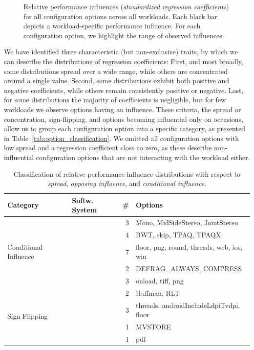 {\begin{figure}
	\caption{Relative performance influences (\textit{standardized regression coefficients}) for all configuration options across all workloads. Each black bar depicts a workload-specific performance influence. For each configuration option, we highlight the range of observed influences.}
	\label{fig:results_influence}
\end{figure}
{\color{orange!80!black}
	We have identified three characteristic (but non-exclusive) traits, by which we can describe the distributions of regression coefficients: First, and most broadly, some distributions spread over a wide range, while others are concentrated around a single value. Second, some distributions exhibit both positive and negative coefficients, while others remain consistently positive or negative. Last, for some distributions the majority of coefficients is negligible, but for few workloads we observe options having an influence. These criteria, the spread or concentration, sign-flipping, and options becoming influential only on occasions, allow us to group each configuration option into a specific category, as presented in Table~\ref{tab:option_classification}. We omitted all configuration options with low spread and a regression coefficient close to zero, as these describe non-influential configuration options that are not interacting with the workload either. 
}
\begin{table}[ht!]
	\centering
	\footnotesize
	\caption{Classification of relative performance influence distributions with respect to \textit{spread}, \textit{opposing influence}, and \textit{conditional influence.}}
	\begin{tabular}{lp{1.5cm}rp{4.3cm}} %
		\toprule
		\textbf{Category} & \textbf{Softw. System} & \textbf{\#} & \textbf{Options} \\
		\midrule
		\multirow{5}{*}{\parbox{1.3cm}{Conditional Influence}} & \jumper & 3 & \textsf{Mono, MidSideStereo, JointStereo}\\
		\cmidrule{2-4}
		 & \kanzi & 4 & \textsf{BWT, skip, TPAQ, TPAQX} \\
		 \cmidrule{2-4}
		 & \dconvert & 7 & \textsf{floor, png, round, threads, web, ios, win} \\
		 \cmidrule{2-4}
		 & \htwo & 2 & \textsf{DEFRAG\_ALWAYS, COMPRESS} \\
		 \cmidrule{2-4}
		 & \batik & 3 & \textsf{onload, tiff, png}\\
		\midrule
		
		\multirow{5}{*}{\parbox{1.3cm}{Sign Flipping}} & \kanzi & 2 & \textsf{Huffman, RLT} \\
		\cmidrule{2-4}
		& \dconvert & 3 & \textsf{threads, androidIncludeLdpiTvdpi, floor} \\
		\cmidrule{2-4}
		& \htwo & 1 & \textsf{MVSTORE}\\
		\cmidrule{2-4}
		& \batik & 1 & \textsf{pdf}\\
		\midrule
		

\end{tabular}
\end{table}}

